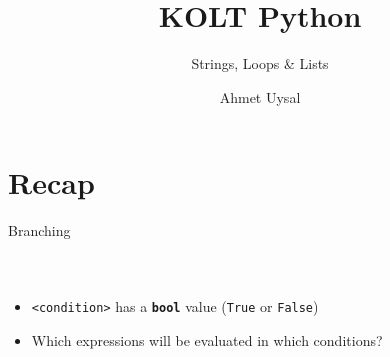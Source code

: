 
\usepackage{../KU-Beamer-Template/style/koc} 
\usepackage{minted}
\usepackage{upquote}
\usepackage{graphicx}

\title{KOLT Python} 
\subtitle{Strings, Loops \& Lists} 
\date{}
\author{Ahmet Uysal}





    \maketitle


    \section{Recap}

        \begin{frame}{Branching}
            \vspace{-3mm}
            \begin{columns}
                \inputminted[firstline=1, lastline=4, frame=single,framesep=2pt]{python3}{../Lecture2/code-examples/branching.py}
                \inputminted[firstline=6, lastline=13, frame=single,framesep=2pt]{python3}{../Lecture2/code-examples/branching.py}
                \inputminted[firstline=15, lastline=27, frame=single,framesep=2pt]{python3}{../Lecture2/code-examples/branching.py}
            \end{columns}
            \begin{itemize}
                \item \texttt{<condition>} has a \textbf{\texttt{bool}} value (\texttt{True} or \texttt{False})
                \item Which expressions will be evaluated in which conditions?
            \end{itemize}
        \end{frame}

